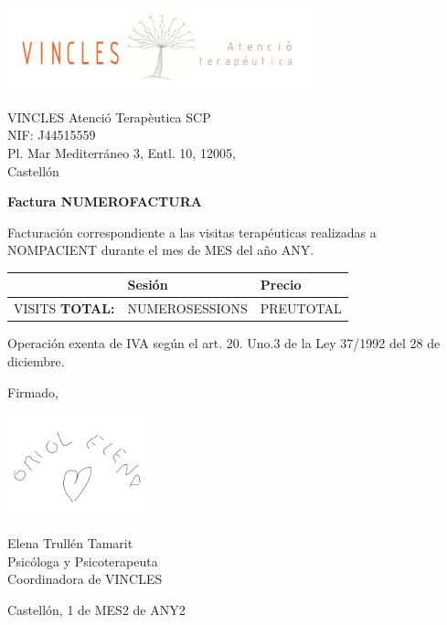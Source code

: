\documentclass[11pt,a4paper]{article}
\begin{document}
\pagestyle{empty}

\mbox{}

\vspace{-2cm}
\begin{center}
	\includegraphics[width=0.65\textwidth]{logo.png}
\end{center}


{\footnotesize

	\noindent
	\begin{minipage}{0.4\textwidth}
		VINCLES Atenció Terapèutica SCP\\
		NIF: J44515559\\
		Pl. Mar Mediterráneo 3, Entl. 10, 12005,\\
		Castellón 
	\end{minipage}
	\hfill

}

\vspace{1cm}

\noindent
\textbf{Factura {NUMEROFACTURA}}

Facturación correspondiente a las visitas terapéuticas realizadas a
{NOMPACIENT} %
durante el mes de {MES} del año {ANY}.


\begin{center}
	\begin{tabular}{rp{}<{\centering}p{}<{\centering}}
		\toprule
		&\textbf{Sesión}	&\textbf{Precio} \\
		\midrule
		{VISITS}
		\midrule
		\textbf{TOTAL:}
		&{NUMEROSESSIONS}	&{PREUTOTAL} \EURtm \\
		\bottomrule
	\end{tabular}
\end{center}

Operación exenta de IVA según el art. 20. Uno.3 de la Ley 37/1992 del 28 de diciembre.

\vspace{0.5cm}

Firmado,

\includegraphics[width=0.3\textwidth]{firma.png}

Elena Trullén Tamarit\\
Psicóloga y Psicoterapeuta\\
Coordinadora de VINCLES

\vspace{0.5cm}

\begin{flushright}
	Castellón, 1 de {MES2} de {ANY2}
\end{flushright}
\end{document}

